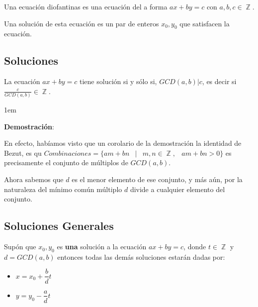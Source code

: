 \documentclass[12pt, fleqn]{report}                             %
\newenvironment{SmallIndentation}[1][0.75em]                    %
    {\begin{adjustwidth}{#1}{}\begin{footnotesize}}                 %
    {\end{footnotesize}\end{adjustwidth}}                           %
\DeclareMathOperator \Space {\quad}                             %
\DeclareMathOperator \MiniSpace {\;}                            %
\newcommand \Such {\MiniSpace|\MiniSpace}                       %
\DeclareMathOperator \Integers  {\mathbb{Z}}                     %
\begin{document}
            Una ecuación diofantinas es una ecuación del a forma $ax+by=c$ con
            $a,b,c \in \Integers$.

            Una solución de esta ecuación es un par de enteros $x_0, y_0$
            que satisfacen la ecuación.


        \subsection{Soluciones}

            La ecuación $ax + by = c$ tiene solución si y sólo si, $GCD(a,b)|c$, es decir
            si $\frac{c}{GCD(a,b)} \in \Integers$.

            \begin{SmallIndentation}[1em]
                \textbf{Demostración}:

                En efecto, habíamos visto que un corolario de la demostración la identidad de Bezut, es qu
                $Combinaciones = \{ am+bn \Such m, n \in \Integers, \MiniSpace am+bn > 0 \}$
                es precisamente el conjunto de múltiplos de $GCD(a,b)$.

                Ahora sabemos que $d$ es el menor elemento de ese conjunto, y más aún, por la naturaleza
                del mínimo común múltiplo $d$ divide a cualquier elemento del conjunto.

            \end{SmallIndentation}


        \clearpage
        \subsection{Soluciones Generales}

            Supón que $x_0, y_0$ es \textbf{una} solución a la ecuación $ax+ by = c$,
            donde $t \in \Integers$ y $d=GCD(a,b)$ entonces todas las demás soluciones
            estarán dadas por:

            \begin{itemize}
                \item $x = x_0 + \dfrac{b}{d}t$
                \item $y = y_0 - \dfrac{a}{d}t$
            \end{itemize}
\end{document}

